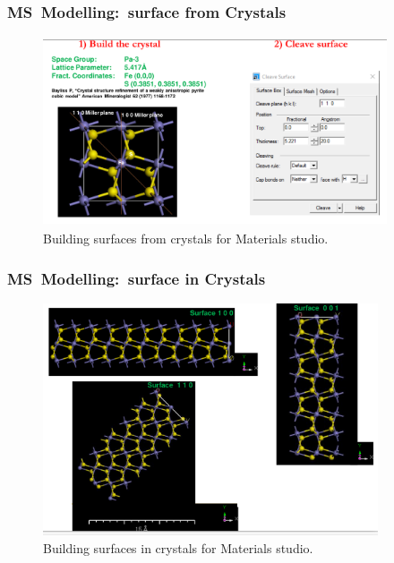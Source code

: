 \frame
{
	\frametitle{\textrm{MS~Modelling:~surface from Crystals}}
\begin{figure}[h!]
\centering
\vspace*{-0.10in}
\includegraphics[height=2.20in,width=4.00in,viewport=0 0 1349 724,clip]{Figures/MS-Building_Cleave_Surface.png}
\caption{\tiny \textrm{Building surfaces from crystals for Materials studio.}}%
\label{MS-Building_Cleave_Surface}
\end{figure}
}

\frame
{
	\frametitle{\textrm{MS~Modelling:~surface in Crystals}}
\begin{figure}[h!]
\centering
\vspace*{-0.18in}
\includegraphics[height=2.70in,width=3.90in,viewport=0 0 1064 737,clip]{Figures/MS-Building_Surface.png}
\caption{\tiny \textrm{Building surfaces in crystals for Materials studio.}}%
\label{MS-Building_Surface}
\end{figure}
}


